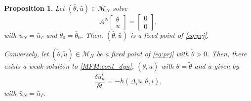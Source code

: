 \documentclass[12pt]{amsart}
\newcommand{\1}{{\chi}}
\newcommand{\Mm}{{\mathcal{M}}}
\newtheorem{pro}{Proposition}
\theoremstyle{definition}
\begin{document}
                
        \begin{pro} 
                Let $(\bar \theta, \bar u)\in \Mm_N$ solve 
            \begin{equation*}
                A^N\left[\begin{array}{c}
                \theta\\
                u
                \end{array}\right]=
                \left[\begin{array}{c}
                        0\\
                        0
                \end{array}\right],
            \end{equation*}
            with $u_N=\bar u_T$ and $\theta_0=\bar \theta_0$.       
            Then, $(\bar \theta, \bar u)$ is a fixed point of \eqref{eq:prj}.
                
            Conversely, let  $(\tilde \theta, \tilde  u)\in \Mm_N$  be a fixed point of \eqref{eq:prj}
            with $\tilde{\theta}>0$. 
            Then, there exists a weak solution to \eqref{MFM:cont_dyn}, $(\bar \theta, \bar u)$ with
            $\bar \theta=\tilde{\theta}$ and $\bar u$ given by
            \begin{equation}
            \label{recovery}
            \frac{\delta \bar u^i_n}{\delta t}= - h(\Delta_i \tilde u,\theta,i),
            \end{equation}         
            with $\bar u_N=\bar u_T$.
        \end{pro}
\end{document}
